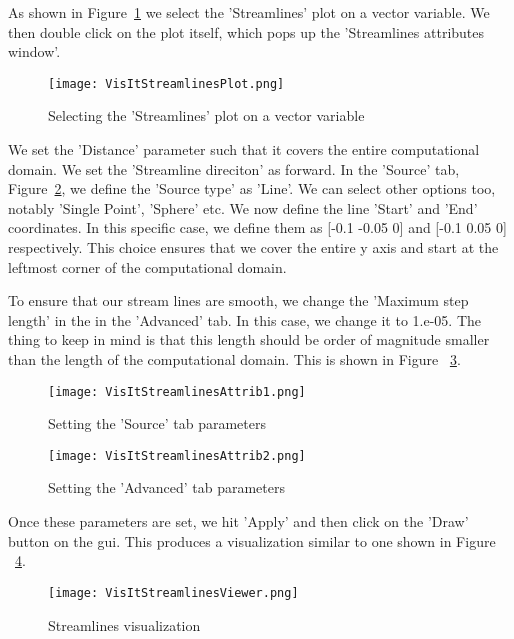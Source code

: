 As shown in Figure~\ref{VisItStreamlinesPlot} we select the 'Streamlines' plot on a vector variable. We then double click on the plot itself, which pops up the 'Streamlines attributes window'. 

\begin{figure}
  \center
  \texttt{[image: VisItStreamlinesPlot.png]}
  \caption{Selecting the 'Streamlines' plot on a vector variable}
  \label{VisItStreamlinesPlot}
\end{figure}

We set the 'Distance' parameter such that it covers the entire computational domain. We set the  'Streamline direciton' as forward. In the 'Source' tab, Figure~\ref{VisItStreamlinesAttrib1}, we define the 'Source type' as 'Line'. We can select other options too, notably 'Single Point', 'Sphere' etc. We now define the line 'Start' and 'End' coordinates. In this specific case, we define them as [-0.1 -0.05 0] and [-0.1 0.05 0] respectively. This choice ensures that we cover the entire y axis and start at the leftmost corner of the computational domain.

To ensure that our stream lines are smooth, we change the 'Maximum step length' in the in the 'Advanced' tab. In this case, we change it to 1.e-05. The thing to keep in mind is that this length should be order of magnitude smaller than the length of the computational domain. This is shown in Figure ~\ref{VisItStreamlinesAttrib2}.

\begin{figure}
  \center
  \texttt{[image: VisItStreamlinesAttrib1.png]}
  \caption{Setting the 'Source' tab parameters}
  \label{VisItStreamlinesAttrib1}
\end{figure}

\begin{figure}
  \center
  \texttt{[image: VisItStreamlinesAttrib2.png]}
  \caption{Setting the 'Advanced' tab parameters}
  \label{VisItStreamlinesAttrib2}
\end{figure}

Once these parameters are set, we hit 'Apply' and then click on the 'Draw' button on the gui. This produces a visualization similar to one shown in Figure ~\ref{VisItStreamlinesViewer}.

\begin{figure}
  \center
  \texttt{[image: VisItStreamlinesViewer.png]}
  \caption{Streamlines visualization}
  \label{VisItStreamlinesViewer}
\end{figure}

